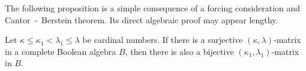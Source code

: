 
\medskip

The following proposition is a simple consequence of a forcing consideration
and Cantor~-~Berstein theorem.
Its direct algebraic proof may appear lengthy.

\begin{proposition}\label{forcing_consideration}
 Let $\kappa \leq \kappa_1 < \lambda_1 \leq \lambda$ be cardinal numbers.
If there is a surjective $(\kappa,\lambda)$-matrix in a complete Boolean
algebra $B$, then there is also a bijective $(\kappa_1,\lambda_1)$-matrix
in $B$.
\end{proposition}

%
%
%
%


